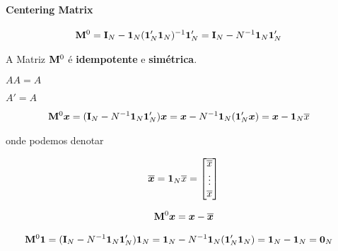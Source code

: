 \documentclass[11pt, oneside, a4paper, article]{article}
\numberwithin{equation}{section}
\begin{document}
\begin{description}
\paragraph{Centering Matrix} \cite[p. 978, A.28]{greene-7ed}

\vspace{-1 em}
\begin{align*}
	\mathbf{M}^{0} &= 
	\mathbf{I}_{N} - \boldsymbol{1}_{N} ( \boldsymbol{1}_{N}' \boldsymbol{1}_{N} )^{-1} \boldsymbol{1}_{N}'
	= 
	\mathbf{I}_{N} - N^{-1} \boldsymbol{1}_{N} \boldsymbol{1}_{N}' 
\end{align*}

A Matriz $\mathbf{M}^{0}$ é \textbf{idempotente} e \textbf{simétrica}.

\begin{description}\itemsep0pt
\item [Idempotência:] $AA = A$
\item [Simetria:] $A'=A$
\end{description}

\vspace{-1 em}
\begin{align*}
\mathbf{M}^{0} \boldsymbol{x} &= 
( \mathbf{I}_{N} - N^{-1} \boldsymbol{1}_{N} \boldsymbol{1}_{N}' ) \boldsymbol{x} 
= 
\boldsymbol{x} - N^{-1} \boldsymbol{1}_{N} (\boldsymbol{1}_{N}' \boldsymbol{x}) 
= 
\boldsymbol{x} - \boldsymbol{1}_{N} \overline{x}
\end{align*}

\noindent
onde podemos denotar

\vspace{-1 em}
\begin{align*}
\overline{\boldsymbol{x}}
=
\boldsymbol{1}_{N} \overline{x}
=
\begin{bmatrix}
\overline{\overline{x}} \\ \vdots \\ \overline{x}
\end{bmatrix}
\end{align*}

\vspace{-1 em}
\begin{align*}
\mathbf{M}^{0} \boldsymbol{x} 
= 
\boldsymbol{x} - \overline{\boldsymbol{x}} 
\end{align*}

\vspace{-1 em}
\begin{align*}
\mathbf{M}^{0} \boldsymbol{1} &= 
( \mathbf{I}_{N} - N^{-1} \boldsymbol{1}_{N} \boldsymbol{1}_{N}' ) \boldsymbol{1}_{N}
= 
\boldsymbol{1}_{N} - N^{-1} \boldsymbol{1}_{N} (\boldsymbol{1}_{N}' \boldsymbol{1}_{N}) 
=
\boldsymbol{1}_{N} - \boldsymbol{1}_{N} 
=
\boldsymbol{0}_{N} 
\end{align*}




\end{description}
\end{document}
